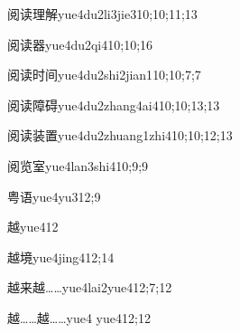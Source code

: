 \begin{verbete}{阅读理解}{yue4du2li3jie3}{10;10;11;13}
\end{verbete}

\begin{verbete}{阅读器}{yue4du2qi4}{10;10;16}
\end{verbete}

\begin{verbete}{阅读时间}{yue4du2shi2jian1}{10;10;7;7}
\end{verbete}

\begin{verbete}{阅读障碍}{yue4du2zhang4ai4}{10;10;13;13}
\end{verbete}

\begin{verbete}{阅读装置}{yue4du2zhuang1zhi4}{10;10;12;13}
\end{verbete}

\begin{verbete}{阅览室}{yue4lan3shi4}{10;9;9}
\end{verbete}

\begin{verbete}{粤语}{yue4yu3}{12;9}
\end{verbete}

\begin{verbete}{越}{yue4}{12}
\end{verbete}

\begin{verbete}{越境}{yue4jing4}{12;14}
\end{verbete}

\begin{verbete}{越来越……}{yue4lai2yue4}{12;7;12}
\end{verbete}

\begin{verbete}{越……越……}{yue4 yue4}{12;12}
\end{verbete}

